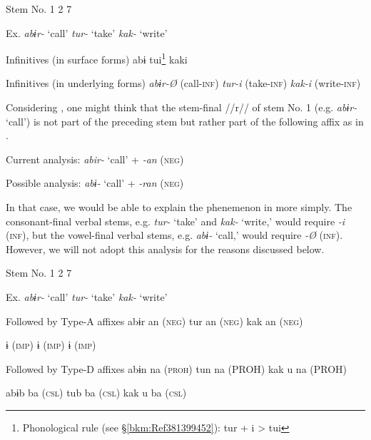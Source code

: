 \begin{table}
\caption{\label{tab:key:66}Infinitives of the verbal stems No. 1, 2, and 7}

Stem No.  1    2    7

Ex.  \textit{abɨr-} ‘call’    \textit{tur-} ‘take’    \textit{kak-} ‘write’

Infinitives (in surface forms)  abɨ      tui\footnote{Phonological rule (see §\ref{bkm:Ref381399452}): tur + i > tui}      kaki

Infinitives (in underlying forms)  \textit{abɨr-Ø}  (call-\textsc{inf})    \textit{tur-i}  (take-\textsc{inf})    \textit{kak-i}  (write-\textsc{inf})
\end{table}

Considering , one might think that the stem-final //r// of stem No. 1 (e.g. \textit{abɨr-} ‘call’) is not part of the preceding stem but rather part of the following affix as in .

\ea\label{ex:8-20}
  Current analysis:  \textit{abir-}  ‘call’  +  \textit{-an}  (\textsc{neg})

  Possible analysis:  \textit{abɨ-}  ‘call’  +  \textit{-ran}  (\textsc{neg})

In that case, we would be able to explain the phenemenon in  more simply. The consonant-final verbal stems, e.g. \textit{tur-} ‘take’ and \textit{kak-} ‘write,’ would require \textit{-i} (\textsc{inf}), but the vowel-final verbal stems, e.g. \textit{abɨ-} ‘call,’ would require \textit{-Ø} (\textsc{inf}). However, we will not adopt this analysis for the reasons discussed below.

\begin{table}
\caption{\label{tab:key:67}. Combinations of verbal roots and Type-A affixes and Type-D affixes}

Stem No.  1    2    7

Ex.  \textit{abɨr-} ‘call’    \textit{tur-} ‘take’    \textit{kak-} ‘write’

Followed by Type-A affixes  abɨr    an (\textsc{neg})    tur    an (\textsc{neg})    kak    an (\textsc{neg})

      ɨ (\textsc{imp})        ɨ (\textsc{imp})        ɨ (\textsc{imp})

Followed by Type-D affixes  abɨn    na (\textsc{proh})    tun    na (PROH)    kak  u  na (PROH)

  abɨb    ba (\textsc{csl})    tub    ba (\textsc{csl})    kak  u  ba (\textsc{csl})
\end{table}

